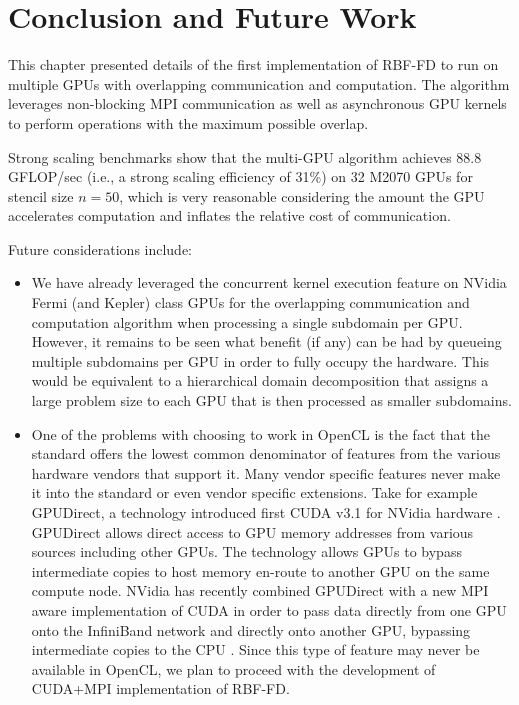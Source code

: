 \section{Conclusion and Future Work}

This chapter presented details of the first implementation of RBF-FD to run on multiple GPUs with overlapping communication and computation. The algorithm leverages non-blocking MPI communication as well as asynchronous GPU kernels to perform operations with the maximum possible overlap. 

Strong scaling benchmarks show that the multi-GPU algorithm achieves 88.8 GFLOP/sec (i.e., a strong scaling efficiency of 31\%) on 32 M2070 GPUs for stencil size $n=50$, which is very reasonable considering the amount the GPU accelerates computation and inflates the relative cost of communication. %

Future considerations include: 
\begin{itemize} 
\item We have already leveraged the concurrent kernel execution feature on NVidia Fermi (and Kepler) class GPUs for the overlapping communication and computation algorithm when processing a single subdomain per GPU. However, it remains to be seen what benefit (if any) can be had by queueing multiple subdomains per GPU in order to fully occupy the hardware. This would be equivalent to a hierarchical domain decomposition that assigns a large problem size to each GPU that is then processed as smaller subdomains. 

\item One of the problems with choosing to work in OpenCL is the fact that the standard offers the lowest common denominator of features from the various hardware vendors that support it. Many vendor specific features never make it into the standard or even vendor specific extensions.
Take for example GPUDirect, a technology introduced first CUDA v3.1 for NVidia hardware \cite{CudaToolkitDoc}. GPUDirect allows direct access to GPU memory addresses from various sources including other GPUs. The technology allows GPUs to bypass intermediate copies to host memory en-route to another GPU on the same compute node. NVidia has recently combined GPUDirect with a new MPI aware implementation of CUDA in order to pass data directly from one GPU onto the InfiniBand network and directly onto another GPU, bypassing intermediate copies to the CPU \cite{NvidiaGPUMPI}. Since this type of feature may never be available in OpenCL, we plan to proceed with the development of CUDA+MPI implementation of RBF-FD.

\end{itemize}


